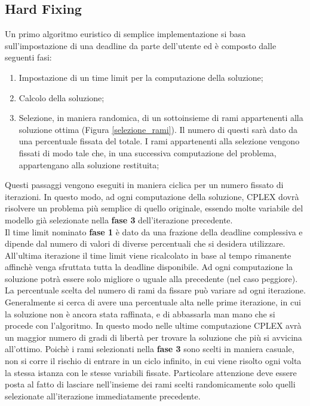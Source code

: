 \subsection{Hard Fixing}\label{hard fixing}
Un primo algoritmo euristico di semplice implementazione si basa sull'impostazione di una deadline da parte dell'utente ed è composto dalle seguenti fasi:
\begin{enumerate}
\item{Impostazione di un time limit per la computazione della soluzione;}
\item{Calcolo della soluzione;}
\item{Selezione, in maniera randomica, di un sottoinsieme di rami appartenenti alla soluzione ottima (Figura \ref{selezione_rami}). 
Il numero di questi sarà dato da una percentuale fissata del totale. I rami appartenenti alla selezione vengono fissati di modo tale che, in una successiva computazione del problema, appartengano alla soluzione restituita;}
\end{enumerate} 
Questi passaggi vengono eseguiti in maniera ciclica per un numero fissato di iterazioni. In questo modo, ad ogni computazione della soluzione, CPLEX dovrà risolvere un problema più semplice di quello originale, essendo molte variabile del modello già selezionate nella \textbf{fase 3} dell'iterazione precedente.\\
Il time limit nominato \textbf{fase 1} è dato da una frazione della deadline complessiva e dipende dal numero di valori di diverse percentuali che si desidera utilizzare. All'ultima iterazione il time limit viene ricalcolato in base al tempo rimanente affinchè venga sfruttata tutta la deadline disponibile. Ad ogni computazione la soluzione potrà essere solo migliore o uguale alla precedente (nel caso peggiore).\\
La percentuale scelta del numero di rami da fissare può variare ad ogni iterazione. Generalmente si cerca di avere una percentuale alta nelle prime iterazione, in cui la soluzione non è ancora stata raffinata, e di abbassarla man mano che si procede con l'algoritmo. In questo modo nelle ultime computazione CPLEX avrà un maggior numero di gradi di libertà per trovare la soluzione che più si avvicina all'ottimo. Poichè i rami selezionati nella \textbf{fase 3} sono scelti in maniera casuale, non si corre il rischio di entrare in un ciclo infinito, in cui viene risolto ogni volta la stessa istanza con le stesse variabili fissate. Particolare attenzione deve essere posta al fatto di lasciare nell'insieme dei rami scelti randomicamente solo quelli selezionate all'iterazione immediatamente precedente.\\
